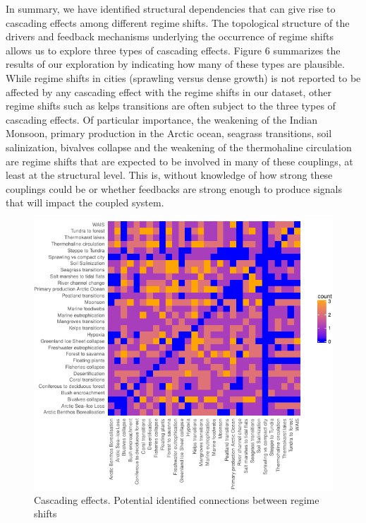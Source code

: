 \documentclass[9pt,]{article}
\begin{document}
In summary, we have identified structural dependencies that can give
rise to cascading effects among different regime shifts. The topological
structure of the drivers and feedback mechanisms underlying the
occurrence of regime shifts allows us to explore three types of
cascading effects. Figure 6 summarizes the results of our exploration by
indicating how many of these types are plausible. While regime shifts in
cities (sprawling versus dense growth) is not reported to be affected by
any cascading effect with the regime shifts in our dataset, other regime
shifts such as kelps transitions are often subject to the three types of
cascading effects. Of particular importance, the weakening of the Indian
Monsoon, primary production in the Arctic ocean, seagrass transitions,
soil salinization, bivalves collapse and the weakening of the
thermohaline circulation are regime shifts that are expected to be
involved in many of these couplings, at least at the structural level.
This is, without knowledge of how strong these couplings could be or
whether feedbacks are strong enough to produce signals that will impact
the coupled system.

\begin{figure}

{\centering \includegraphics{170417_draft_files/figure-latex/Fig6-1} 

}

\caption{Cascading effects. Potential identified connections between regime shifts}\label{fig:Fig6}
\end{figure}
\end{document}
